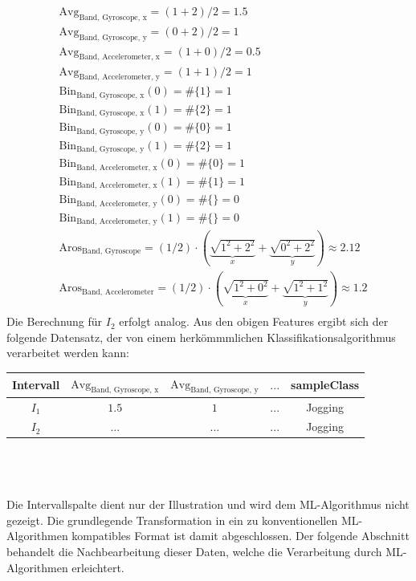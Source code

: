 \begin{align*}
&\text{Avg}_\text{Band, Gyroscope, x} = (1 + 2)/2 = 1.5 \\
&\text{Avg}_\text{Band, Gyroscope, y} = (0 + 2)/2 = 1 \\
&\text{Avg}_\text{Band, Accelerometer, x} = (1 + 0)/2 = 0.5 \\
&\text{Avg}_\text{Band, Accelerometer, y} = (1 + 1)/2 = 1 \\
&\text{Bin}_\text{Band, Gyroscope, x}(0) = \#\{1\} = 1 \\
&\text{Bin}_\text{Band, Gyroscope, x}(1) = \#\{2\} = 1 \\
&\text{Bin}_\text{Band, Gyroscope, y}(0) = \#\{0\} = 1 \\
&\text{Bin}_\text{Band, Gyroscope, y}(1) = \#\{2\} = 1 \\
&\text{Bin}_\text{Band, Accelerometer, x}(0) = \#\{0\} = 1 \\
&\text{Bin}_\text{Band, Accelerometer, x}(1) = \#\{1\} = 1 \\
&\text{Bin}_\text{Band, Accelerometer, y}(0) = \#\{\} = 0 \\
&\text{Bin}_\text{Band, Accelerometer, y}(1) = \#\{\} = 0 \\
&\text{Aros}_\text{Band, Gyroscope} = (1/2) \cdot (\underbrace{\sqrt{1^2 + 2^2}}_x + \underbrace{\sqrt{0^2 + 2^2}}_y) \approx 2.12 \\
&\text{Aros}_\text{Band, Accelerometer} = (1/2) \cdot (\underbrace{\sqrt{1^2 + 0^2}}_x + \underbrace{\sqrt{1^2 + 1^2}}_y) \approx 1.2 \\
\end{align*}
Die Berechnung für $I_2$ erfolgt analog. Aus den obigen Features ergibt sich der folgende Datensatz, der von einem herkömmmlichen Klassifikationsalgorithmus verarbeitet werden kann:\\

\begin{tabular}{|c|c|c|c|c|}
	\hline 
	Intervall & $\text{Avg}_\text{Band, Gyroscope, x}$ & $\text{Avg}_\text{Band, Gyroscope, y}$  & $...$  & sampleClass  \\ 
	\hline 
	$I_1$ & $1.5$ & $1$ & $...$ & Jogging \\ 
	\hline 
	$I_2$ & $...$ & $...$ & $...$ & Jogging   \\ 
	\hline 
\end{tabular} \\\\\\
Die Intervallspalte dient nur der Illustration und wird dem \ac{ML}-Algorithmus nicht gezeigt. Die grundlegende Transformation in ein zu konventionellen ML-Algorithmen kompatibles Format ist damit abgeschlossen. Der folgende Abschnitt behandelt die Nachbearbeitung dieser Daten, welche die Verarbeitung durch ML-Algorithmen erleichtert.

